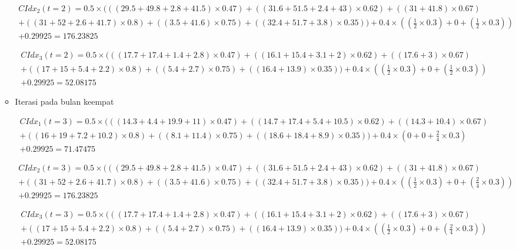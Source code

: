 \begin{itemize}
\begin{itemize}
\begin{multline}
	CIdx_{2}(t=2) = 0.5 \times (((29.5+49.8+2.8+41.5) \times 0.47) + ((31.6+51.5+2.4+43) \times 0.62) + ((31+41.8) \times 0.67)\\ + ((31+52+2.6+41.7) \times 0.8) + ((3.5+41.6) \times 0.75) + ((32.4+51.7 + 3.8) \times 0.35)) + 0.4 \times ((\frac {1} {2} \times 0.3) + 0 +  (\frac {1} {2} \times 0.3))\\ + 0.29925 = 176.23825
\end{multline}

\begin{multline}
	CIdx_{3}(t=2) = 0.5 \times (((17.7+17.4+1.4+2.8) \times 0.47) + ((16.1+15.4+3.1+2) \times 0.62) + ((17.6+3) \times 0.67)\\ + ((17+15+5.4+2.2) \times 0.8) + ((5.4+2.7) \times 0.75) + ((16.4+13.9) \times 0.35)) + 0.4 \times ((\frac {1} {2} \times 0.3) + 0 +  (\frac {1} {2} \times 0.3))\\ + 0.29925 = 52.08175
\end{multline}

	\item Iterasi pada bulan keempat
	
	\begin{multline}
	CIdx_{1}(t=3) = 0.5 \times (((14.3+4.4+19.9+11) \times 0.47) + ((14.7+17.4+5.4+10.5) \times 0.62) + ((14.3+10.4) \times 0.67)\\ + ((16+19+7.2+10.2) \times 0.8) + ((8.1+11.4) \times 0.75) + ((18.6+18.4+8.9) \times 0.35) ) + 0.4 \times (0 + 0 + \frac{2}{4} \times 0.3)\\ + 0.29925 = 71.47475
\end{multline}

\begin{multline}
	CIdx_{2}(t=3) = 0.5 \times (((29.5+49.8+2.8+41.5) \times 0.47) + ((31.6+51.5+2.4+43) \times 0.62) + ((31+41.8) \times 0.67)\\ + ((31+52+2.6+41.7) \times 0.8) + ((3.5+41.6) \times 0.75) + ((32.4+51.7 + 3.8) \times 0.35)) + 0.4 \times ((\frac {1} {2} \times 0.3) + 0 +  (\frac {2} {4} \times 0.3))\\ + 0.29925 = 176.23825
\end{multline}

\begin{multline}
	CIdx_{3}(t=3) = 0.5 \times (((17.7+17.4+1.4+2.8) \times 0.47) + ((16.1+15.4+3.1+2) \times 0.62) + ((17.6+3) \times 0.67)\\ + ((17+15+5.4+2.2) \times 0.8) + ((5.4+2.7) \times 0.75) + ((16.4+13.9) \times 0.35)) + 0.4 \times ((\frac {1} {2} \times 0.3) + 0 +  (\frac {2} {4} \times 0.3))\\ + 0.29925 = 52.08175
\end{multline}


\end{itemize}
\end{itemize}
